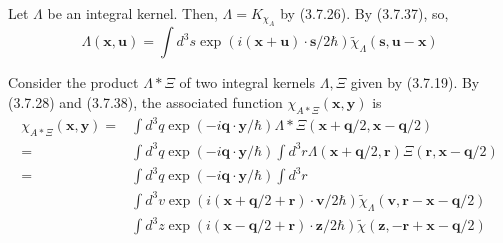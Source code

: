 \documentclass{article}
\begin{document}
Let $\Lambda$ be an integral kernel. Then, $\Lambda=K_{\chi_{A}}$ by (3.7.26). By (3.7.37), so,
$$
\begin{equation*}
\Lambda(\boldsymbol{x}, \boldsymbol{u})=\int d^{3} s \exp (i(\boldsymbol{x}+\boldsymbol{u}) \cdot \boldsymbol{s} / 2 \hbar) \tilde{\chi}_{\Lambda}(\boldsymbol{s}, \boldsymbol{u}-\boldsymbol{x}) \tag{3.7.38}
\end{equation*}
$$

Consider the product $\Lambda * \Xi$ of two integral kernels $\Lambda, \Xi$ given by (3.7.19). By (3.7.28) and (3.7.38), the associated function $\chi_{A * \Xi}(\boldsymbol{x}, \boldsymbol{y})$ is
$$
\begin{align*}
\chi_{A * \Xi}(\boldsymbol{x}, \boldsymbol{y})= & \int d^{3} q \exp (-i \boldsymbol{q} \cdot \boldsymbol{y} / \hbar) \Lambda * \Xi(\boldsymbol{x}+\boldsymbol{q} / 2, \boldsymbol{x}-\boldsymbol{q} / 2)  \tag{3.7.39}\\
= & \int d^{3} q \exp (-i \boldsymbol{q} \cdot \boldsymbol{y} / \hbar) \int d^{3} r \Lambda(\boldsymbol{x}+\boldsymbol{q} / 2, \boldsymbol{r}) \Xi(\boldsymbol{r}, \boldsymbol{x}-\boldsymbol{q} / 2) \\
= & \int d^{3} q \exp (-i \boldsymbol{q} \cdot \boldsymbol{y} / \hbar) \int d^{3} r \\
& \int d^{3} v \exp (i(\boldsymbol{x}+\boldsymbol{q} / 2+\boldsymbol{r}) \cdot \boldsymbol{v} / 2 \hbar) \tilde{\chi}_{\Lambda}(\boldsymbol{v}, \boldsymbol{r}-\boldsymbol{x}-\boldsymbol{q} / 2) \\
& \int d^{3} z \exp (i(\boldsymbol{x}-\boldsymbol{q} / 2+\boldsymbol{r}) \cdot \boldsymbol{z} / 2 \hbar) \tilde{\chi}(\boldsymbol{z},-\boldsymbol{r}+\boldsymbol{x}-\boldsymbol{q} / 2)
\end{align*}
$$
\end{document}
